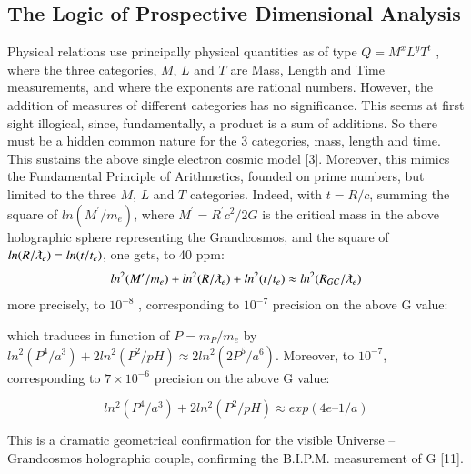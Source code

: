 \documentclass[twoside,draft]{article}
\begin{document}
\begin{sloppypar}
{\subsection{The Logic of Prospective Dimensional Analysis}

Physical relations use principally physical quantities as of type $Q = M^{x} L^{y} T^{t}$ , where
the three categories, $M$, $L$ and $T$ are Mass, Length and Time measurements, and where the exponents are
rational numbers. However, the addition of measures of different categories has no significance.
This seems at first sight illogical, since, fundamentally, a product is a sum of additions. So there
must be a hidden common nature for the 3 categories, mass, length and time. This sustains the
above single electron cosmic model [3]. Moreover, this mimics the Fundamental Principle of
Arithmetics, founded on prime numbers, but limited to the three $M$, $L$ and $T$ categories. Indeed, with $t =
R/c$, summing the square of $ln(M^{\prime}/m_{e} )$, where $M^{\prime} = R^{\prime} c^{2} /2G$ is the critical mass in the above
holographic sphere representing the Grandcosmos, and the square of $ln(R/\lambdabar_{e} ) = ln(t/t_{e} )$, one gets, to
40 ppm:
\begin{equation}
ln^{2} (M^{\prime}/m_{e} ) + ln^{2} (R/\lambdabar_{e}) + ln^2 (t/t_{e} ) \approx ln^2 (R_{GC} /\lambdabar_{e} )
\end{equation}
more precisely, to $10^{-8}$ , corresponding to $10^{-7}$ precision on the above G value:

which traduces in function of $P = m_P/m_e$ by $ln^2(P^4/a^3) + 2 ln^2(P^2/pH) \approx 2 ln^2(2P^5/a^6)$. Moreover, to $10^{-7}$, corresponding to $7 \times 10^{-6}$ precision on the above G value:

\begin{equation}
ln^2(P^4/a^3) + 2 ln^2(P^2/pH) \approx exp(4e – 1/a)
\end{equation}
 
This is a dramatic geometrical confirmation for the visible Universe – Grandcosmos holographic couple, confirming the B.I.P.M. measurement of  G [11].


}
\end{sloppypar}
\end{document}
